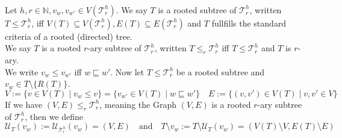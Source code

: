 \documentclass[12pt]{article}
\newcommand{\T}[0]{{\mathcal{T}_r^h}}
\newenvironment{statement3}[3]{\begin{trivlist}
\item[\hskip \labelsep {\bfseries #1}\hskip \labelsep {\bfseries #2} {#3}\textbf{.}]}{\end{trivlist}}
\begin{document}
\begin{statement3}{(1.2)}{Definition}{(Subtrees and Ordering)}\strut\\[2pt]
    Let $h,r \in \mathbb{N}, v_w, v_{w'} \in V(\T)$.
    We say $T$ is a rooted subtree of $\T$, written $T \leq \T$, iff $V(T) \subseteq V(\T), E(T) \subseteq E(\T)$
    and $T$ fullfills the standard criteria of a rooted (directed) tree.\\[5pt]
    We say $T$ is a rooted $r$-ary subtree of $\T$, written $T \leq_r \T$ iff $T \leq \T$ and $T$ is $r$-ary.\\[5pt]
    We write $v_w \leq v_{w'}$ iff $w \sqsubseteq w'$. Now let $T \leq \T$ be a rooted subtree and
    $v_w \in T \setminus \{R(T)\}$.\\
    $$
        V := \{v \in V(T) \mid v_w \leq v\} = \{v_{w'} \in V(T) \mid w \sqsubseteq w'\}
        \quad E := \{(v,v') \in V(T) \mid v,v' \in V\}
    $$
    If we have $(V,E) \leq_r \T$, meaning the Graph $(V,E)$ is a rooted $r$-ary subtree of $\T$, then we define
    $$
        \mathcal{U}_T(v_w) := \mathcal{U}_\T(v_w) = (V,E)\quad\text{and}\quad
        T \setminus v_w := T \setminus \mathcal{U}_T(v_w) = (V(T) \setminus V, E(T) \setminus E)
    $$
\end{statement3}
\end{document}
